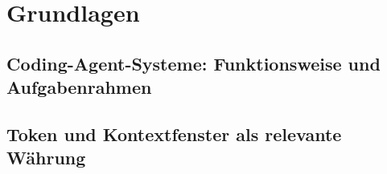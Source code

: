 
\chapter{Grundlagen}
\label{chap:grundlagen}

\section{Coding-Agent-Systeme: Funktionsweise und Aufgabenrahmen}%
\label{sec:coding-agent-systeme}

\section{Token und Kontextfenster als relevante Währung}%
\label{sec:token-kontextfenster}

